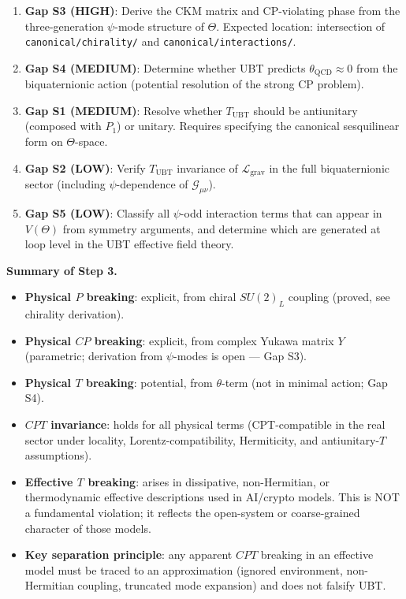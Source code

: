 \documentclass[12pt,a4paper]{article}
\theoremstyle{definition}
\theoremstyle{remark}
\begin{document}
\begin{enumerate}
  \item \textbf{Gap S3 (HIGH)}: Derive the CKM matrix and CP-violating phase
    from the three-generation $\psi$-mode structure of $\Theta$.
    Expected location: intersection of
    \texttt{canonical/chirality/} and \texttt{canonical/interactions/}.
  \item \textbf{Gap S4 (MEDIUM)}: Determine whether UBT predicts
    $\theta_{\mathrm{QCD}} \approx 0$ from the biquaternionic action
    (potential resolution of the strong CP problem).
  \item \textbf{Gap S1 (MEDIUM)}: Resolve whether $T_{\mathrm{UBT}}$ should
    be antiunitary (composed with $P_1$) or unitary.
    Requires specifying the canonical sesquilinear form on $\Theta$-space.
  \item \textbf{Gap S2 (LOW)}: Verify $T_{\mathrm{UBT}}$ invariance of
    $\mathcal{L}_{\mathrm{grav}}$ in the full biquaternionic sector
    (including $\psi$-dependence of $\mathcal{G}_{\mu\nu}$).
  \item \textbf{Gap S5 (LOW)}: Classify all $\psi$-odd interaction terms
    that can appear in $V(\Theta)$ from symmetry arguments, and determine
    which are generated at loop level in the UBT effective field theory.
\end{enumerate}

\begin{resultbox}
\textbf{Summary of Step 3.}
\begin{itemize}
  \item \textbf{Physical $P$ breaking}: explicit, from chiral $SU(2)_L$ coupling
    (proved, see chirality derivation).
  \item \textbf{Physical $CP$ breaking}: explicit, from complex Yukawa matrix
    $Y$ (parametric; derivation from $\psi$-modes is open --- Gap S3).
  \item \textbf{Physical $T$ breaking}: potential, from $\theta$-term
    (not in minimal action; Gap S4).
  \item \textbf{$CPT$ invariance}: holds for all physical terms
    (CPT-compatible in the real sector under locality, Lorentz-compatibility,
    Hermiticity, and antiunitary-$T$ assumptions).
  \item \textbf{Effective $T$ breaking}: arises in dissipative, non-Hermitian,
    or thermodynamic effective descriptions used in AI/crypto models.
    This is NOT a fundamental violation; it reflects the open-system or
    coarse-grained character of those models.
  \item \textbf{Key separation principle}: any apparent $CPT$ breaking in an
    effective model must be traced to an approximation (ignored environment,
    non-Hermitian coupling, truncated mode expansion) and does not falsify UBT.
\end{itemize}
\end{resultbox}

\ifdefined\INCLUDEMODE
\else
  
\end{document}
